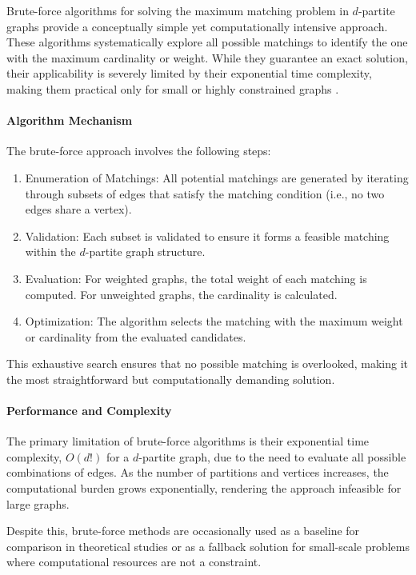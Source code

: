 
Brute-force algorithms for solving the maximum matching problem in \(d\)-partite graphs provide a conceptually simple yet computationally intensive approach. These algorithms systematically explore all possible matchings to identify the one with the maximum cardinality or weight. While they guarantee an exact solution, their applicability is severely limited by their exponential time complexity, making them practical only for small or highly constrained graphs \cite{garey1979computers}.

\paragraph{Algorithm Mechanism}
The brute-force approach involves the following steps:
\begin{enumerate}
    \item Enumeration of Matchings:
    All potential matchings are generated by iterating through subsets of edges that satisfy the matching condition (i.e., no two edges share a vertex).
    \item Validation:
    Each subset is validated to ensure it forms a feasible matching within the \(d\)-partite graph structure.
    \item Evaluation:
    For weighted graphs, the total weight of each matching is computed. For unweighted graphs, the cardinality is calculated.
    \item Optimization:
    The algorithm selects the matching with the maximum weight or cardinality from the evaluated candidates.
\end{enumerate}

This exhaustive search ensures that no possible matching is overlooked, making it the most straightforward but computationally demanding solution.

\paragraph{Performance and Complexity}
The primary limitation of brute-force algorithms is their exponential time complexity, \(O(d!)\) for a \(d\)-partite graph, due to the need to evaluate all possible combinations of edges. As the number of partitions and vertices increases, the computational burden grows exponentially, rendering the approach infeasible for large graphs.

Despite this, brute-force methods are occasionally used as a baseline for comparison in theoretical studies or as a fallback solution for small-scale problems where computational resources are not a constraint.

